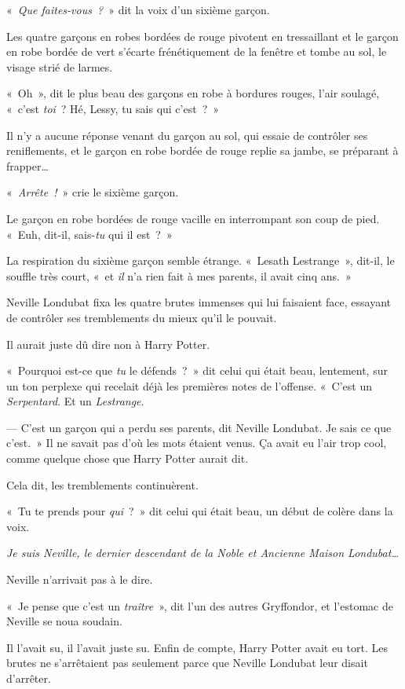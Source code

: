 «~\emph{Que faites-vous~?}~» dit la voix d'un sixième garçon.

Les quatre garçons en robes bordées de rouge pivotent en tressaillant et le garçon en robe bordée de vert s'écarte frénétiquement de la fenêtre et tombe au sol, le visage strié de larmes.

«~Oh~», dit le plus beau des garçons en robe à bordures rouges, l'air soulagé, «~c'est \emph{toi}~?
Hé, Lessy, tu sais qui c'est~?~»

Il n'y a aucune réponse venant du garçon au sol, qui essaie de contrôler ses reniflements, et le garçon en robe bordée de rouge replie sa jambe, se préparant à frapper…

«~\emph{Arrête~!}~» crie le sixième garçon.

Le garçon en robe bordées de rouge vacille en interrompant son coup de pied.
«~Euh, dit-il, sais-\emph{tu} qui il est~?~»

La respiration du sixième garçon semble étrange.
«~Lesath Lestrange~», dit-il, le souffle très court, «~et \emph{il} n'a rien fait à mes parents, il avait cinq ans.~»

\later

Neville Londubat fixa les quatre brutes immenses qui lui faisaient face, essayant de contrôler ses tremblements du mieux qu'il le pouvait.

Il aurait juste dû dire non à Harry Potter.

«~Pourquoi est-ce que \emph{tu} le défends~?~»
dit celui qui était beau, lentement, sur un ton perplexe qui recelait déjà les premières notes de l'offense.
«~C'est un \emph{Serpentard}.
Et un \emph{Lestrange}.

--- C'est un garçon qui a perdu ses parents, dit Neville Londubat.
Je sais ce que c'est.~»
Il ne savait pas d'où les mots étaient venus.
Ça avait eu l'air trop cool, comme quelque chose que Harry Potter aurait dit.

Cela dit, les tremblements continuèrent.

«~Tu te prends pour \emph{qui}~?~»
dit celui qui était beau, un début de colère dans la voix.

\emph{Je suis Neville, le dernier descendant de la Noble et Ancienne Maison Londubat…}

Neville n'arrivait pas à le dire.

«~Je pense que c'est un \emph{traître}~», dit l'un des autres Gryffondor, et l'estomac de Neville se noua soudain.

Il l'avait su, il l'avait juste su.
Enfin de compte, Harry Potter avait eu tort.
Les brutes ne s'arrêtaient pas seulement parce que Neville Londubat leur disait d'arrêter.

